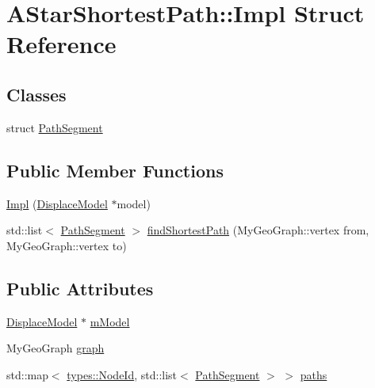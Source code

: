 \hypertarget{struct_a_star_shortest_path_1_1_impl}{}\section{A\+Star\+Shortest\+Path\+::Impl Struct Reference}
\label{struct_a_star_shortest_path_1_1_impl}
\subsection*{Classes}
\begin{DoxyCompactItemize}
\item 
struct \mbox{\hyperlink{struct_a_star_shortest_path_1_1_impl_1_1_path_segment}{Path\+Segment}}
\end{DoxyCompactItemize}
\subsection*{Public Member Functions}
\begin{DoxyCompactItemize}
\item 
\mbox{\hyperlink{struct_a_star_shortest_path_1_1_impl_ad2ba7393a9f4735121dce3a44c9c7317}{Impl}} (\mbox{\hyperlink{class_displace_model}{Displace\+Model}} $\ast$model)
\item 
std\+::list$<$ \mbox{\hyperlink{struct_a_star_shortest_path_1_1_impl_1_1_path_segment}{Path\+Segment}} $>$ \mbox{\hyperlink{struct_a_star_shortest_path_1_1_impl_a4b2e3e26b0e086bc47fe4a8561a1f1e0}{find\+Shortest\+Path}} (My\+Geo\+Graph\+::vertex from, My\+Geo\+Graph\+::vertex to)
\end{DoxyCompactItemize}
\subsection*{Public Attributes}
\begin{DoxyCompactItemize}
\item 
\mbox{\hyperlink{class_displace_model}{Displace\+Model}} $\ast$ \mbox{\hyperlink{struct_a_star_shortest_path_1_1_impl_acea59d8fd9fd3b48c426686d872e9d27}{m\+Model}}
\item 
My\+Geo\+Graph \mbox{\hyperlink{struct_a_star_shortest_path_1_1_impl_a038762cd3a18c21ca215822c9f75bec8}{graph}}
\item 
std\+::map$<$ \mbox{\hyperlink{classtypes_1_1_node_id}{types\+::\+Node\+Id}}, std\+::list$<$ \mbox{\hyperlink{struct_a_star_shortest_path_1_1_impl_1_1_path_segment}{Path\+Segment}} $>$ $>$ \mbox{\hyperlink{struct_a_star_shortest_path_1_1_impl_a03b8667c177a77302b4310bc5a311d19}{paths}}
\end{DoxyCompactItemize}


